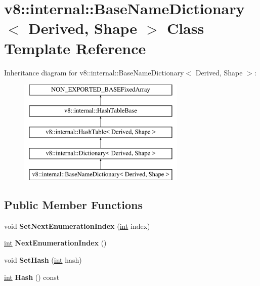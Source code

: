 \hypertarget{classv8_1_1internal_1_1BaseNameDictionary}{}\section{v8\+:\+:internal\+:\+:Base\+Name\+Dictionary$<$ Derived, Shape $>$ Class Template Reference}
\label{classv8_1_1internal_1_1BaseNameDictionary}
Inheritance diagram for v8\+:\+:internal\+:\+:Base\+Name\+Dictionary$<$ Derived, Shape $>$\+:\begin{figure}[H]
\begin{center}
\leavevmode
\includegraphics[height=5.000000cm]{classv8_1_1internal_1_1BaseNameDictionary}
\end{center}
\end{figure}
\subsection*{Public Member Functions}
\begin{DoxyCompactItemize}
\item 
\mbox{\label{classv8_1_1internal_1_1BaseNameDictionary_a0a4f61c1ad8b07edb59872675ffbc017}} 
void {\bfseries Set\+Next\+Enumeration\+Index} (\mbox{\hyperlink{classint}{int}} index)
\item 
\mbox{\label{classv8_1_1internal_1_1BaseNameDictionary_a3bf9b1802e623bb2789f919686a00648}} 
\mbox{\hyperlink{classint}{int}} {\bfseries Next\+Enumeration\+Index} ()
\item 
\mbox{\label{classv8_1_1internal_1_1BaseNameDictionary_acab9b3b2753161dcef2cc049981718fb}} 
void {\bfseries Set\+Hash} (\mbox{\hyperlink{classint}{int}} hash)
\item 
\mbox{\label{classv8_1_1internal_1_1BaseNameDictionary_aea86b40490c2124c06083e6f51ad875d}} 
\mbox{\hyperlink{classint}{int}} {\bfseries Hash} () const
\end{DoxyCompactItemize}
